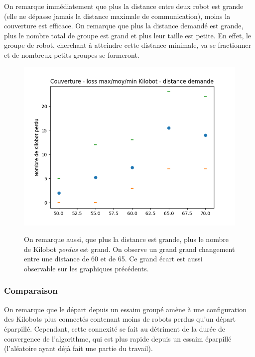 \documentclass[a4paper]{article}
\begin{document}
On remarque immédiatement que plus la distance entre deux robot est grande (elle ne dépasse jamais la distance maximale de communication), moins la couverture est efficace. On remarque que plus la distance demandé est grande, plus le nombre total de groupe est grand et plus leur taille est petite. En effet, le groupe de robot, cherchant à atteindre cette distance minimale, va se fractionner et de nombreux petits groupes se formeront. 

\begin{figure}[h!]
	\begin{minipage}[c]{.46\linewidth}
		\centering
	\includegraphics[width=1.1\linewidth]{../../script_results/Couverture_loss_kilobot.png}
	\end{minipage}
	\begin{minipage}[c]{.46\linewidth}
	On remarque aussi, que plus la distance est grande, plus le nombre de Kilobot \textit{perdus} est grand. On observe un grand grand changement entre une distance de 60 et de 65. Ce grand écart est aussi observable sur les graphiques précédents.
	\end{minipage}
\end{figure}
\newpage
\subsubsection{Comparaison}
On remarque que le départ depuis un essaim groupé amène à une configuration des Kilobots plus connectés contenant moins de robots perdus qu'un départ éparpillé. Cependant, cette connexité se fait au détriment de la durée de convergence de l'algorithme, qui est plus rapide depuis un essaim éparpillé (l'aléatoire ayant déjà fait une partie du travail).
\newpage
\end{document}
